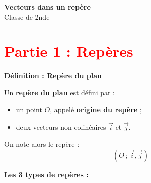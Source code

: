\documentclass[12pt]{article}
\begin{document}
\begin{center}
    {\LARGE \textbf{Vecteurs dans un repère}}\\[2mm]
    {\large Classe de 2nde}
\end{center}


\section*{\textcolor{red}{Partie 1 : Repères}}

\vspace{5pt}

\begin{mdframed}[
    linewidth=1pt,
    roundcorner=5pt,
    linecolor=ForestGreen,
    innertopmargin=10pt,
    innerbottommargin=10pt
]
{\color{ForestGreen}\textbf{\underline{Définition :} Repère du plan}}

\vspace{5pt}
Un \textbf{repère du plan} est défini par :
\begin{itemize}
    \item un point $O$, appelé \textbf{origine du repère} ;
    \item deux vecteurs non colinéaires $\overrightarrow{i}$ et $\overrightarrow{j}$.
\end{itemize}
\vspace{5pt}
On note alors le repère :
\[
(O \,;\, \overrightarrow{i}, \overrightarrow{j})
\]
\end{mdframed}

\vspace{10pt}

\underline{\textbf{Les 3 types de repères :}}

\vspace{10pt}
\end{document}
